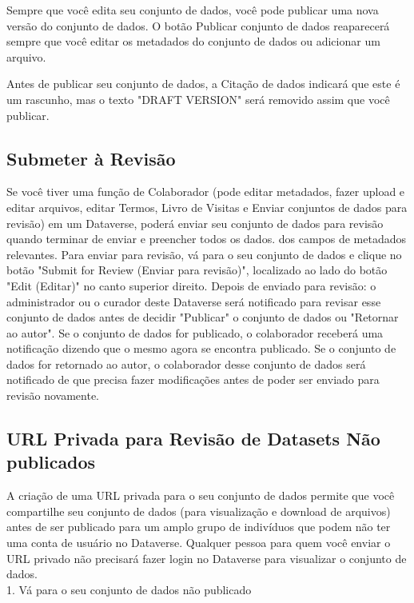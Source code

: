 \documentclass[12pt,hidelinks]{article}
\begin{document}
Sempre que você edita seu conjunto de dados, você pode publicar uma nova versão do conjunto de dados. O botão Publicar conjunto de dados reaparecerá sempre que você editar os metadados do conjunto de dados ou adicionar um arquivo.

Antes de publicar seu conjunto de dados, a Citação de dados indicará que este é um rascunho, mas o texto "DRAFT VERSION" será removido assim que você publicar.
    
    \subsection{Submeter à Revisão}
    
\qquad Se você tiver uma função de Colaborador (pode editar metadados, fazer upload e editar arquivos, editar Termos, Livro de Visitas e Enviar conjuntos de dados para revisão) em um Dataverse, poderá enviar seu conjunto de dados para revisão quando terminar de enviar e preencher todos os dados. dos campos de metadados relevantes. Para enviar para revisão, vá para o seu conjunto de dados e clique no botão "Submit for Review (Enviar para revisão)", localizado ao lado do botão "Edit (Editar)" no canto superior direito. Depois de enviado para revisão: o administrador ou o curador deste Dataverse será notificado para revisar esse conjunto de dados antes de decidir "Publicar" o conjunto de dados ou "Retornar ao autor". Se o conjunto de dados for publicado, o colaborador receberá uma notificação dizendo que o mesmo agora se encontra publicado. Se o conjunto de dados for retornado ao autor, o colaborador desse conjunto de dados será notificado de que precisa fazer modificações antes de poder ser enviado para revisão novamente.
    
    \subsection{URL Privada para Revisão de Datasets Não publicados}
    
\qquad A criação de uma URL privada para o seu conjunto de dados permite que você compartilhe seu conjunto de dados (para visualização e download de arquivos) antes de ser publicado para um amplo grupo de indivíduos que podem não ter uma conta de usuário no Dataverse. Qualquer pessoa para quem você enviar o URL privado não precisará fazer login no Dataverse para visualizar o conjunto de dados.\\

1. Vá para o seu conjunto de dados não publicado\\
\end{document}
